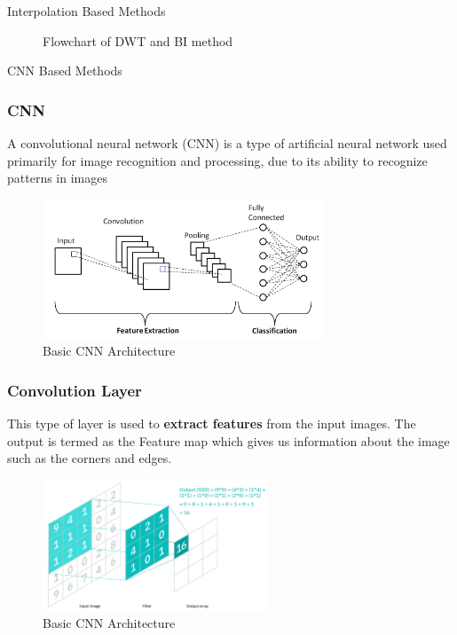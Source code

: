 \documentclass[11pt, presentation]{beamer}
\begin{document}
\begin{section}{Interpolation Based Methods}
\begin{frame}
{\begin{figure}
                \caption{Flowchart of DWT and BI method}
                \label{fig:dwt-method}
                \end{figure}
            }
        \end{frame}
    \end{section}
    \begin{section}{CNN Based Methods}
        \begin{frame}
            \frametitle{CNN}
            A convolutional neural network (CNN) is a type of artificial neural network used primarily for image recognition and processing,
            due to its ability to recognize patterns in images~\cite{armcnn}
            \begin{figure}
                \includegraphics[width=0.75\textwidth]{images/cnn}
                \caption{Basic CNN Architecture~\cite{ugcnn}}
                \label{fig:cnn-arch}
            \end{figure}
        \end{frame}
        \begin{frame}
            \frametitle{Convolution Layer}
            This type of layer is used to \textbf{extract features} from the input images.
            The output is termed as the Feature map which gives us information about the image such as the corners and edges.
            \begin{figure}
                \includegraphics[width=0.6\textwidth]{images/conv-layer}
                \caption{Basic CNN Architecture~\cite{ugcnn}}
                \label{fig:conv-layer}
            \end{figure}

\end{frame}
\end{section}
\end{document}
